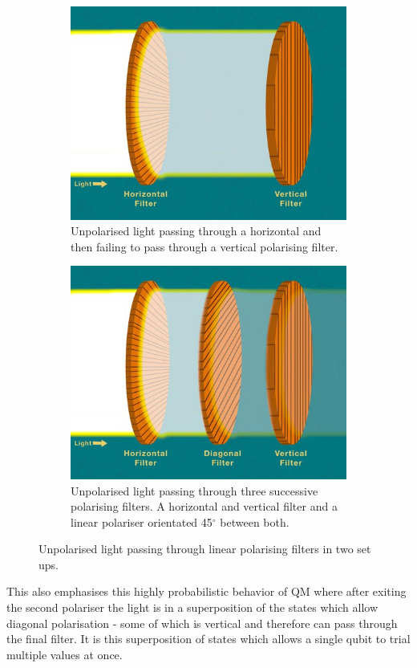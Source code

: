 \begin{figure}[H]
  \centering
  \begin{subfigure}[t]{0.4\textwidth}
    \centering
    \includegraphics[width=\textwidth]{images/2 polariser.jpg}
    \caption{Unpolarised light passing through a horizontal and then failing to pass through a vertical polarising filter.}\label{fig:2 polarise}
  \end{subfigure}
  \begin{subfigure}[t]{0.4\textwidth}
    \centering
    \includegraphics[width=\textwidth]{images/3 polariser.jpg}
    \caption{Unpolarised light passing through three successive polarising filters. A horizontal and vertical filter and a linear polariser orientated 45$^\circ$ between both. }\label{fig:3 polarise}
  \end{subfigure}
  \caption{Unpolarised light passing through linear polarising filters in two set ups. \cite{noauthor_whatCal_nodate}}
  \label{fig:polarisers}
\end{figure}
This also emphasises this highly probabilistic behavior of QM where after exiting the second polariser the light is in a superposition of the states which allow diagonal polarisation - some of which is vertical and therefore can pass through the final filter.
It is this superposition of states which allows a single qubit to trial multiple values at once. \cite{sonialopezbravo_understanding_nodate}


